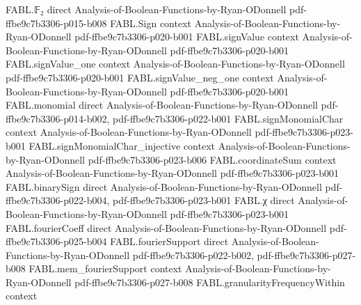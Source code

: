 \begin{theorem}
\label{FABL.length_widthThreeTseitinClauseBlock_le}
\leanok
{}
\proofstep
  {FABL.𝔽₂}
  {direct}
  {Analysis-of-Boolean-Functions-by-Ryan-ODonnell}
  {pdf-ffbe9c7b3306-p015-b008}
\proofstep
  {FABL.Sign}
  {context}
  {Analysis-of-Boolean-Functions-by-Ryan-ODonnell}
  {pdf-ffbe9c7b3306-p020-b001}
\proofstep
  {FABL.signValue}
  {context}
  {Analysis-of-Boolean-Functions-by-Ryan-ODonnell}
  {pdf-ffbe9c7b3306-p020-b001}
\proofstep
  {FABL.signValue_one}
  {context}
  {Analysis-of-Boolean-Functions-by-Ryan-ODonnell}
  {pdf-ffbe9c7b3306-p020-b001}
\proofstep
  {FABL.signValue_neg_one}
  {context}
  {Analysis-of-Boolean-Functions-by-Ryan-ODonnell}
  {pdf-ffbe9c7b3306-p020-b001}
\proofstep
  {FABL.monomial}
  {direct}
  {Analysis-of-Boolean-Functions-by-Ryan-ODonnell}
  {pdf-ffbe9c7b3306-p014-b002,
    pdf-ffbe9c7b3306-p022-b001}
\proofstep
  {FABL.signMonomialChar}
  {context}
  {Analysis-of-Boolean-Functions-by-Ryan-ODonnell}
  {pdf-ffbe9c7b3306-p023-b001}
\proofstep
  {FABL.signMonomialChar_injective}
  {context}
  {Analysis-of-Boolean-Functions-by-Ryan-ODonnell}
  {pdf-ffbe9c7b3306-p023-b006}
\proofstep
  {FABL.coordinateSum}
  {context}
  {Analysis-of-Boolean-Functions-by-Ryan-ODonnell}
  {pdf-ffbe9c7b3306-p023-b001}
\proofstep
  {FABL.binarySign}
  {direct}
  {Analysis-of-Boolean-Functions-by-Ryan-ODonnell}
  {pdf-ffbe9c7b3306-p022-b004,
    pdf-ffbe9c7b3306-p023-b001}
\proofstep
  {FABL.χ}
  {direct}
  {Analysis-of-Boolean-Functions-by-Ryan-ODonnell}
  {pdf-ffbe9c7b3306-p023-b001}
\proofstep
  {FABL.fourierCoeff}
  {direct}
  {Analysis-of-Boolean-Functions-by-Ryan-ODonnell}
  {pdf-ffbe9c7b3306-p025-b004}
\proofstep
  {FABL.fourierSupport}
  {direct}
  {Analysis-of-Boolean-Functions-by-Ryan-ODonnell}
  {pdf-ffbe9c7b3306-p022-b002,
    pdf-ffbe9c7b3306-p027-b008}
\proofstep
  {FABL.mem_fourierSupport}
  {context}
  {Analysis-of-Boolean-Functions-by-Ryan-ODonnell}
  {pdf-ffbe9c7b3306-p027-b008}
\proofstep
  {FABL.granularityFrequencyWithin}
  {context}

\end{theorem}
